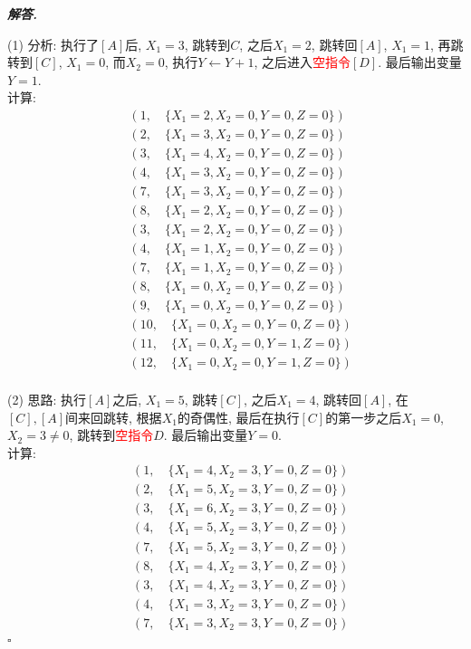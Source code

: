 \documentclass[10pt, a4paper, oneside]{ctexart}
\newenvironment{solution}{%
  \par\noindent\textbf{\textit{解答. }}\ignorespaces
}{%
  \hfill\ensuremath{\square}\par
}
\begin{document}
    \begin{solution}
    (1) 分析: 执行了$[A]$后, $X_1=3$, 跳转到$C$, 之后$X_1=2$, 跳转回$[A]$, $X_1=1$, 再跳转到$[C]$, $X_1=0$, 而$X_2=0$, 执行$Y\leftarrow Y+1$, 之后进入\textcolor{red}{空指令}$[D]$. 最后输出变量$Y=1$.\\
    计算: 
    \begin{align*}
    &(1,\quad\{X_1=2,X_2=0,Y=0,Z=0\})\\
    &(2,\quad\{X_1=3,X_2=0,Y=0,Z=0\})\\
    &(3,\quad\{X_1=4,X_2=0,Y=0,Z=0\})\\
    &(4,\quad\{X_1=3,X_2=0,Y=0,Z=0\})\\
    &(7,\quad\{X_1=3,X_2=0,Y=0,Z=0\})\\
    &(8,\quad\{X_1=2,X_2=0,Y=0,Z=0\})\\
    &(3,\quad\{X_1=2,X_2=0,Y=0,Z=0\})\\
    &(4,\quad\{X_1=1,X_2=0,Y=0,Z=0\})\\
    &(7,\quad\{X_1=1,X_2=0,Y=0,Z=0\})\\
    &(8,\quad\{X_1=0,X_2=0,Y=0,Z=0\})\\
    &(9,\quad\{X_1=0,X_2=0,Y=0,Z=0\})\\
    &(10,\quad\{X_1=0,X_2=0,Y=0,Z=0\})\\
    &(11,\quad\{X_1=0,X_2=0,Y=1,Z=0\})\\
    &(12,\quad\{X_1=0,X_2=0,Y=1,Z=0\})
    \end{align*}
    \\(2) 思路: 执行$[A]$之后, $X_1=5$, 跳转$[C]$, 之后$X_1=4$, 跳转回$[A]$, 在$[C],[A]$间来回跳转, 根据$X_1$的奇偶性, 最后在执行$[C]$的第一步之后$X_1=0$, $X_2=3\neq 0$, 跳转到\textcolor{red}{空指令}$D$. 最后输出变量$Y=0$.\\
    计算: 
    \begin{align*}
    &(1, \quad \{X_1=4,X_2=3,Y=0,Z=0\})\\
    &(2, \quad \{X_1=5,X_2=3,Y=0,Z=0\})\\
    &(3, \quad \{X_1=6,X_2=3,Y=0,Z=0\})\\
    &(4, \quad \{X_1=5,X_2=3,Y=0,Z=0\})\\
    &(7, \quad \{X_1=5,X_2=3,Y=0,Z=0\})\\
    &(8, \quad \{X_1=4,X_2=3,Y=0,Z=0\})\\
    &(3, \quad \{X_1=4,X_2=3,Y=0,Z=0\})\\
    &(4, \quad \{X_1=3,X_2=3,Y=0,Z=0\})\\
    &(7, \quad \{X_1=3,X_2=3,Y=0,Z=0\})\\

\end{align*}
\end{solution}
\end{document}
